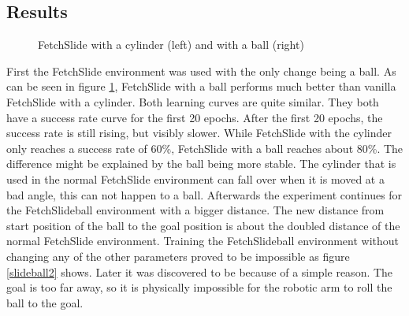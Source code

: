 


\subsection{Results}


\begin{figure} [!h]
	
	\centering
	\caption{FetchSlide with a cylinder (left) and with a ball (right)}
	\label{slidecomp}
\end{figure}


First the FetchSlide environment was used with the only change being a ball. As can be seen in figure \ref{slidecomp}, FetchSlide with a ball performs much better than vanilla FetchSlide with a cylinder. Both learning curves are quite similar. They both have a success rate curve for the first 20 epochs. After the first 20 epochs, the success rate is still rising, but visibly slower. While FetchSlide with the cylinder only reaches a success rate of 60\%, FetchSlide with a ball reaches about 80\%. The difference might be explained by the ball being more stable. The cylinder that is used in the normal FetchSlide environment can fall over when it is moved at a bad angle, this can not happen to a ball.
\newline
Afterwards the experiment continues for the FetchSlideball environment with a bigger distance. The new distance from start position of the ball to the goal position is about the doubled distance of the normal FetchSlide environment.
Training the FetchSlideball environment without changing any of the other parameters proved to be impossible as figure \ref{slideball2} shows. Later it was discovered to be because of a simple reason. The goal is too far away, so it is physically impossible for the robotic arm to roll the ball to the goal.
 
